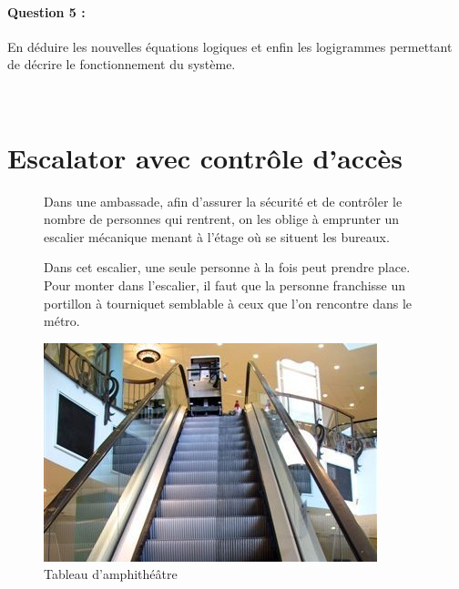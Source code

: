 \paragraph{Question 5 :} En déduire les nouvelles équations logiques et enfin les logigrammes permettant de décrire le 
fonctionnement du système.

\newpage

~\

\newpage

\section{Escalator avec contrôle d'accès}

\begin{figure}[!h]
\begin{minipage}{0.55\linewidth}
Dans une ambassade, afin d'assurer la sécurité et de contrôler le nombre de personnes qui rentrent, on les oblige à emprunter un escalier mécanique menant à l'étage où se situent les bureaux.

Dans cet escalier, une seule personne à la fois peut prendre place. Pour monter dans l'escalier, il faut que la personne franchisse un portillon à tourniquet semblable à ceux que l'on rencontre dans le métro.
\end{minipage}
\hfill
\begin{minipage}{0.4\linewidth}
 \begin{center}
 \includegraphics[width=0.8\linewidth]{img/escalator.jpg}
 \end{center}
 \caption{Tableau d'amphithéâtre}
 \label{img6}
 \end{minipage}
\end{figure}

